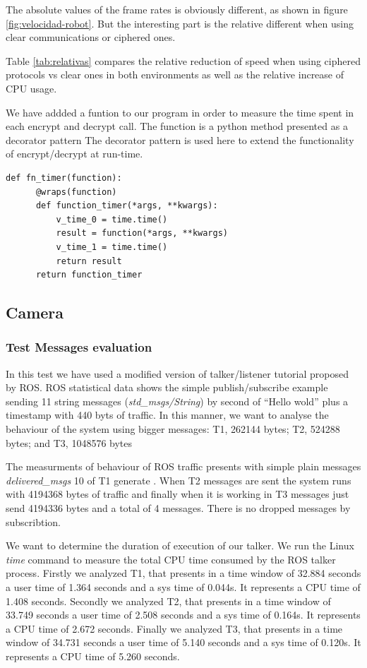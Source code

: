 \documentclass[journal,twoside]{JoPhA}
\begin{document}
The absolute values of the frame rates is obviously different, as shown in figure \ref{fig:velocidad-robot}. But the interesting part is the relative different when using clear communications or ciphered ones. 

Table \ref{tab:relativas}  compares the relative reduction of speed when using ciphered protocols vs clear ones in both environments as well as the relative increase of CPU usage.

We have addded a funtion to our program in order to measure the time spent in each encrypt and decrypt call. The function is a python method presented as a decorator pattern 
The decorator pattern is used here to extend the functionality of encrypt/decrypt at run-time. 


{
  \footnotesize{
    \begin{Verbatim}[frame=single]
def fn_timer(function):
	  @wraps(function)
	  def function_timer(*args, **kwargs):
	      v_time_0 = time.time()
	      result = function(*args, **kwargs)
	      v_time_1 = time.time()
	      return result
	  return function_timer
    \end{Verbatim}
  }
}


\subsection{Camera}

\subsubsection{Test Messages evaluation}

In this test we have used a modified version of talker/listener tutorial proposed by ROS. 
ROS statistical data shows the simple publish/subscribe example sending 11 string messages ({\em std\_msgs/String}) by second of ``Hello wold'' plus a timestamp with 440 byts of traffic.
In this manner, we want to analyse the behaviour of the system using bigger messages: T1, 262144 bytes; T2,  524288 bytes; and T3, 1048576 bytes 

The measurments of behaviour of ROS traffic presents with simple plain messages {\em delivered\_msgs} 10 of T1 generate . When T2 messages are sent the system runs with 4194368 bytes of traffic and finally when it is working in  T3 messages just send 4194336 bytes and a total of 4 messages. There is no dropped messages by subscribtion.

We want to determine the duration of execution of our talker. We run the Linux {\em time} command to measure the total CPU time consumed by the ROS talker process. 
Firstly we analyzed T1, that presents in a time window of 32.884 seconds a user time of  1.364 seconds and a sys time of 0.044s. It represents a CPU time of 1.408 seconds.
Secondly we analyzed T2, that presents in a time window of 33.749 seconds a user time of  2.508 seconds and a sys time of 0.164s. It represents a CPU time of 2.672 seconds.
Finally we analyzed T3, that presents in a time window of 34.731 seconds a user time of  5.140 seconds and a sys time of 0.120s. It represents a CPU time of 5.260 seconds.
\end{document}
